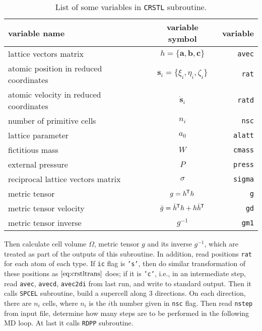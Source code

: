 \begin{table}[h]
	\centering
	\caption{List of some variables in \texttt{CRSTL} subroutine.}
	\begin{tabular}{@{}lcr@{}}
		\toprule
		variable name                          & variable symbol                                 & variable       \\
		\midrule
		lattice vectors matrix                 & $h = \{ \bm{a}, \bm{b}, \bm{c} \}$              & \texttt{avec}  \\
		atomic position in reduced coordinates & $\bm{s}_i = \{\xi_i, \eta_i, \zeta_i\}$         & \texttt{rat}   \\
		atomic velocity in reduced coordinates & $\dot{ \bm{s} }_i$                              & \texttt{ratd}  \\
		number of primitive cells              & $n_i$                                           & \texttt{nsc}   \\
		lattice parameter                      & $a_0$                                           & \texttt{alatt} \\
		fictitious mass                        & $W$                                             & \texttt{cmass} \\
		external pressure                      & $P$                                             & \texttt{press} \\
		reciprocal lattice vectors matrix      & $\sigma$                                        & \texttt{sigma} \\
		metric tensor                          & $g = h ^{\mkern-1.5mu\mathsf{T}} h$                                 & \texttt{g}     \\
		metric tensor velocity                 & $\dot{g} = \dot{ h }^{\mkern-1.5mu\mathsf{T}} h + h \dot{ h }^{\mkern-1.5mu\mathsf{T}}$ & \texttt{gd}    \\
		metric tensor inverse                  & $g^{-1}$                                        & \texttt{gm1}   \\
		\bottomrule
	\end{tabular}%
	\label{tab:crstl}%
\end{table}%

Then calculate cell volume $\Omega$, metric tensor $g$ and its inverse $g^{-1}$, which are
treated as part of the outputs of this subroutine.
In addition, read positions \texttt{rat} for each atom of each type.
If \texttt{ic} flag is \texttt{'s'},
then do similar transformation of these positions as $\eqref{eq:crstltrans}$ does;
if it is \texttt{'c'}, i.e., in an intermediate step, read
\texttt{avec}, \texttt{avecd}, \texttt{avec2di} from last run,
and write to standard output.
Then it calls \texttt{SPCEL} subroutine, build a supercell along $3$ directions. On each direction,
there are $n_i$ cells, where $n_i$ is the $i$th number given in \texttt{nsc} flag.
Then read \texttt{nstep} from input file, determine how many steps are
to be performed in the following MD loop.
At last it calls \texttt{RDPP} subroutine.
